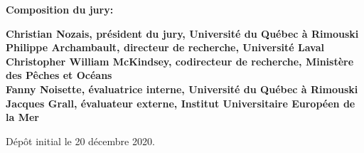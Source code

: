 \thispagestyle{empty}

\null
\vfill
\noindent \textbf{Composition du jury:}\\
\vspace{1cm}

\begin{singlespace}
  \noindent \textbf{Christian Nozais, président du jury, Université du Québec à Rimouski}\\

  \noindent \textbf{Philippe Archambault, directeur de recherche, Université Laval}\\

  \noindent \textbf{Christopher William McKindsey, codirecteur de recherche, Ministère des Pêches et Océans}\\

  \noindent \textbf{Fanny Noisette, évaluatrice interne, Université du Québec à Rimouski}\\

  \noindent \textbf{Jacques Grall, évaluateur externe, Institut Universitaire Européen de la Mer}\\
\end{singlespace}

\vspace{2cm}
\noindent Dépôt initial le 20 décembre 2020.
\hspace{3cm}


\cleardoublepage

